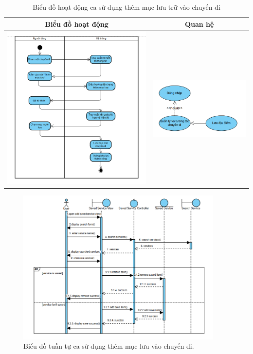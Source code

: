 \begin{table}[H] %
    \centering
    \caption{Biểu đồ hoạt động ca sử dụng thêm mục lưu trữ vào chuyến đi} %
    \label{tab:uc_add_saved_item_diagrams} %
    \begin{tabular}{| c | c |}
        \hline
        \textbf{Biểu đồ hoạt động} & \textbf{Quan hệ} \\
        \hline
        \includegraphics[width=0.5\linewidth]{figures/c3/3-3-12-ad.png} %
        &
        \includegraphics[width=0.45\linewidth]{figures/c3/3-3-12-rd.png} \\ %
        \hline
    \end{tabular}
\end{table}

\begin{figure}[H]
    \centering
    \includegraphics[width=0.92\textwidth]{figures/c3/3-3-12-sd.png} %
    \caption{Biểu đồ tuần tự ca sử dụng thêm mục lưu vào chuyến đi.} %
    \label{fig:3-3-12-sequence-diagram}
\end{figure}